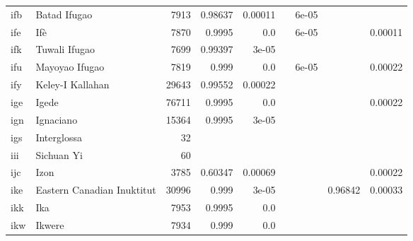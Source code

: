 \documentclass[11pt]{article}
\begin{document}
\begin{table*}[h]
{\begin{tabular}{llrrrrrrr}
ifb         & Batad Ifugao         & 7913         & 0.98637         & 0.00011         &          & 6e-05         &          &          \\

ife         & Ifè         & 7870         & 0.9995         & 0.0         &          & 6e-05         &          & 0.00011         \\

ifk         & Tuwali Ifugao         & 7699         & 0.99397         & 3e-05         &          &          &          &          \\

ifu         & Mayoyao Ifugao         & 7819         & 0.999         & 0.0         &          & 6e-05         &          & 0.00022         \\

ify         & Keley-I Kallahan         & 29643         & 0.99552         & 0.00022         &          &          &          &          \\

ige         & Igede         & 76711         & 0.9995         & 0.0         &          &          &          & 0.00022         \\

ign         & Ignaciano         & 15364         & 0.9995         & 3e-05         &          &          &          &          \\

igs         & Interglossa         & 32         &          &          &          &          &          &          \\

iii         & Sichuan Yi         & 60         &          &          &          &          &          &          \\

ijc         & Izon         & 3785         & 0.60347         & 0.00069         &          &          &          & 0.00022         \\

ike         & Eastern Canadian Inuktitut         & 30996         & 0.999         & 3e-05         &          &          & 0.96842         & 0.00033         \\

ikk         & Ika         & 7953         & 0.9995         & 0.0         &          &          &          &          \\

ikw         & Ikwere         & 7934         & 0.999         & 0.0         &          &          &          &          \\


\end{tabular}}
\end{table*}
\end{document}
